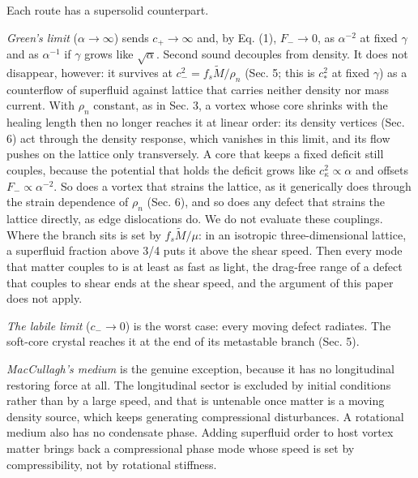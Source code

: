 \documentclass[
  11pt,
]{article}
\begin{document}
Each route has a supersolid counterpart.

\emph{Green's limit} (\(\alpha\to\infty\)) sends \(c_+\to\infty\) and,
by Eq. (1), \(F_-\to0\), as \(\alpha^{-2}\) at fixed \(\gamma\) and as
\(\alpha^{-1}\) if \(\gamma\) grows like \(\sqrt\alpha\). Second sound
decouples from density. It does not disappear, however: it survives at
\(c_-^2=f_s\tilde M/\rho_n\) (Sec. 5; this is \(c_*^2\) at fixed
\(\gamma\)) as a counterflow of superfluid against lattice that carries
neither density nor mass current. With \(\rho_n\) constant, as in Sec.
3, a vortex whose core shrinks with the healing length then no longer
reaches it at linear order: its density vertices (Sec. 6) act through
the density response, which vanishes in this limit, and its flow pushes
on the lattice only transversely. A core that keeps a fixed deficit
still couples, because the potential that holds the deficit grows like
\(c_\kappa^2\propto\alpha\) and offsets \(F_-\propto\alpha^{-2}\). So
does a vortex that strains the lattice, as it generically does through
the strain dependence of \(\rho_n\) (Sec. 6), and so does any defect
that strains the lattice directly, as edge dislocations do. We do not
evaluate these couplings. Where the branch sits is set by
\(f_s\tilde M/\mu\): in an isotropic three-dimensional lattice, a
superfluid fraction above 3/4 puts it above the shear speed. Then every
mode that matter couples to is at least as fast as light, the drag-free
range of a defect that couples to shear ends at the shear speed, and the
argument of this paper does not apply.

\emph{The labile limit} (\(c_-\to0\)) is the worst case: every moving
defect radiates. The soft-core crystal reaches it at the end of its
metastable branch (Sec. 5).

\emph{MacCullagh's medium} is the genuine exception, because it has no
longitudinal restoring force at all. The longitudinal sector is excluded
by initial conditions rather than by a large speed, and that is
untenable once matter is a moving density source, which keeps generating
compressional disturbances. A rotational medium also has no condensate
phase. Adding superfluid order to host vortex matter brings back a
compressional phase mode whose speed is set by compressibility, not by
rotational stiffness.
\end{document}
